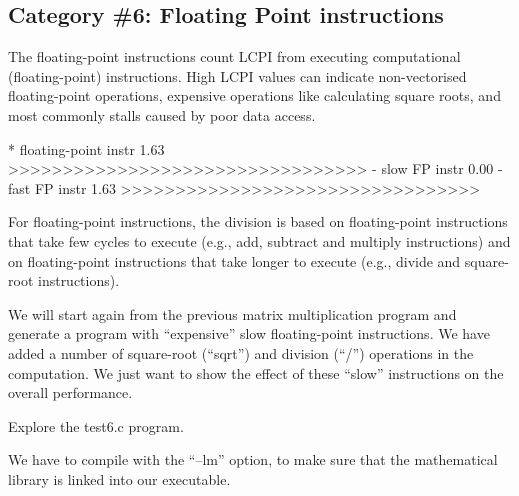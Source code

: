 \subsection{Category \#6: Floating Point instructions}
\label{subsec:CAT6_FP_Instructions}

The floating-point instructions count LCPI from executing computational (floating-point) instructions. High LCPI values can indicate non-vectorised floating-point operations, expensive operations like calculating square roots, and most commonly stalls caused by poor data access.

\begin{prompt}
* floating-point instr  1.63 >>>>>>>>>>>>>>>>>>>>>>>>>>>>>>>>>
 - slow FP instr        0.00
 - fast FP instr        1.63 >>>>>>>>>>>>>>>>>>>>>>>>>>>>>>>>>
\end{prompt}

For floating-point instructions, the division is based on floating-point instructions that take few cycles to execute (e.g., add, subtract and multiply instructions) and on floating-point instructions that take longer to execute (e.g., divide and square-root instructions).

We will start again from the previous matrix multiplication program and generate a program with ``expensive'' slow floating-point instructions. We have added a number of square-root (``sqrt'') and division (``/'') operations in the computation. We just want to show the effect of these ``slow'' instructions on the overall performance.

Explore the test6.c program.

\begin{prompt}
\end{prompt}

We have to compile with the ``--lm'' option, to make sure that the mathematical library is linked into our executable.

